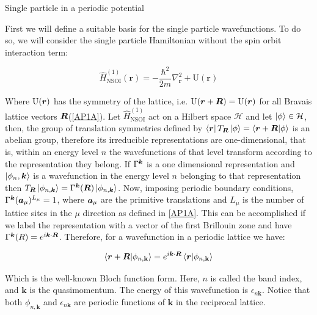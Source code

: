 \begin{section}{Single particle in a periodic potential}

First we will define a suitable basis for the single particle wavefunctions. To do so, we will consider the single particle Hamiltonian without the spin orbit interaction term:

\begin{equation}
\label{LaticeHam}
\hat{H}^{(1)}_{\text{NSOI}}(\textbf{r}) = -\frac{\hbar^2}{2m}\nabla^2_{\textbf{r}} + \text{U}(\textbf{r})
\end{equation}

Where $\text{U}(\boldsymbol{r})$ has the symmetry of the lattice, i.e. $\text{U}(\boldsymbol{r} + \boldsymbol{R}) = \text{U}(\boldsymbol{r})$ for all Bravais lattice vectors $\boldsymbol{R}$(\ref{AP1A}). Let $\hat{H}^{(1)}_{\text{NSOI}}$ act on a Hilbert space $\mathcal{H}$ and let $\ket{\phi} \in \mathcal{H}$, then, the group of translation symmetries defined by $\bra{\boldsymbol{r}} T_{\boldsymbol{R}} \ket{\phi} = \bra{\boldsymbol{r} + \boldsymbol{R}} \ket{\phi}$ is an abelian group, therefore its irreducible representations are one-dimensional, that is, within an energy level $n$ the wavefunctions of that level transform according to the representation they belong. If $\Gamma^{\boldsymbol{k}}$ is a one dimensional representation and $\ket{\phi_n, \boldsymbol{k}}$ is a wavefunction in the energy level $n$ belonging to that representation then $T_{\boldsymbol{R}}\ket{\phi_{n, \boldsymbol{k}}} = \Gamma^{\boldsymbol{k}}(\boldsymbol{R}) \ket{\phi_{n, \boldsymbol{k}}}$. Now, imposing periodic boundary conditions, $\Gamma^{\boldsymbol{k}}(\boldsymbol{a}_\mu)^{L_\mu} = 1$, where $\boldsymbol{a}_\mu$ are the primitive translations and $L_\mu$ is the number of lattice sites in the $\mu$ direction as defined in \ref{AP1A}. This can be accomplished if we label the representation with a vector of the first Brillouin zone and have $\Gamma^{\boldsymbol{k}}(R) = e^{i \boldsymbol{k} \cdot \boldsymbol{R}}$. Therefore, for a wavefunction in a periodic lattice we have:

\begin{equation}
\label{Bloch1}
\bra{\boldsymbol{r}+\boldsymbol{R}} \ket{\phi_{n, \textbf{k}}} = e^{i\boldsymbol{k}\cdot\boldsymbol{R}}\bra{\boldsymbol{r}} \ket{\phi_{n, \textbf{k}}}
\end{equation}

Which is the well-known Bloch function form. Here, $n$ is called the band index, and $\textbf{k}$ is the quasimomentum. The energy of this wavefunction is $\epsilon_{n \textbf{k}}$.  Notice that both $\phi_{n,\textbf{k}}$ and $\epsilon_{n \textbf{k}}$ are periodic functions of $\textbf{k}$ in the reciprocal lattice.


\end{section}
